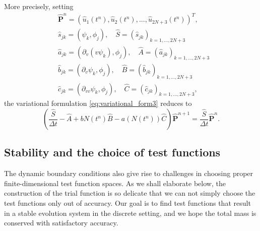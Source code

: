 More precisely, setting
\begin{equation}
    \label{eq:Matrix2}
    \begin{aligned}
        &\hat{\mathbf{P}}^n=(\hat{u}_1(t^n),\hat{u}_2(t^n),...,\hat{u}_{2N+3}(t^n))^T,\\
        &\hat{s}_{jk}=(\psi_k,\phi_j),\quad \hat{S}=(\hat{s}_{jk})_{k=1,...,2N+3}\\
        &\hat{a}_{jk}=(\partial_v(v\psi_k),\phi_j),\quad \hat{A}=(\hat{a}_{jk})_{k=1,...,2N+3}\\
        &\hat{b}_{jk}=(\partial_{v}\psi_k,\phi_j),\quad \hat{B}=(\hat{b}_{jk})_{k=1,...,2N+3}\\
        &\hat{c}_{jk}=(\partial_{vv}\psi_k,\phi_j),\quad \hat{C}=(\hat{c}_{jk})_{k=1,...,2N+3},
    \end{aligned}
\end{equation}
the  variational formulation \eqref{eq:variational_form3} reduces to
\begin{equation}
\label{eq:system2}
    \left(\frac{\hat{S}}{\Delta t}-\hat{A}+bN(t^n)\hat{B}-a(N(t^n))\hat{C}\right)\hat{\mathbf{P}}^{n+1}=\frac{\hat{S}}{\Delta t}\hat{\mathbf{P}}^n.
\end{equation}











\subsection{Stability and the choice of test functions} \label{sec:stability}

The dynamic boundary conditions also give rise to challenges in choosing proper finite-dimensional test function spaces.  As we shall elaborate below, the construction of the trial function is so delicate that we can not simply choose the test functions only out of accuracy. Our goal is to find test functions that result in a stable evolution system in the discrete setting, and we hope the total mass is conserved with satisfactory accuracy. 



